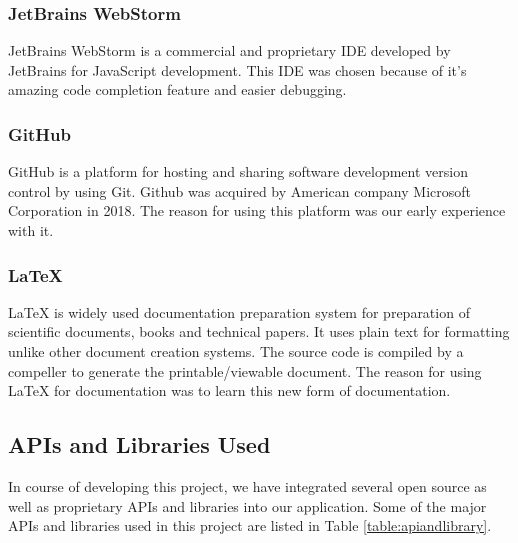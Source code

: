 \documentclass[12pt, a4paper, oneside]{article}
\begin{document}
\subsubsection{JetBrains WebStorm}
JetBrains WebStorm is a commercial and proprietary IDE developed by JetBrains for JavaScript development. This IDE was chosen because of it's amazing code completion feature and easier debugging.

\subsubsection{GitHub}
GitHub is a platform for hosting and sharing software development version control by using Git. Github was acquired by American company Microsoft Corporation in 2018. The reason for using this platform was our early experience with it. 

\subsubsection{LaTeX}
LaTeX is widely used documentation preparation system for preparation of scientific documents, books and technical papers. It uses plain text for formatting unlike other document creation systems. The source code is compiled by a compeller to generate the printable/viewable document. The reason for using LaTeX for documentation was to learn this new form of documentation.


\subsection{APIs and Libraries Used}
In course of developing this project, we have integrated several open source as well as proprietary APIs and libraries into our application. Some of the major APIs and libraries used in this project are listed in Table \ref{table:apiandlibrary}.
\end{document}
